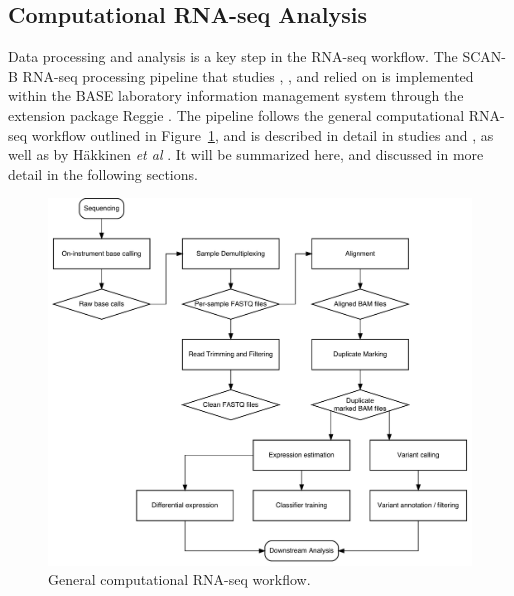 \documentclass[11pt]{book}
\newcommand{\scanb}{\mbox{SCAN-B}}
\begin{document}
\subsection{Computational RNA-seq Analysis}

Data processing and analysis is a key step in the RNA-seq workflow. The \scanb{} RNA-seq processing pipeline that studies \I, \III, and \IV relied on is implemented within the BASE laboratory information management system \cite{Base:2002, Base:2009} through the extension package Reggie \cite{Reggie:2016}. The pipeline follows the general computational RNA-seq workflow outlined in Figure~\ref{fig:rnaseq-workflow}, and is described in detail in studies \I and \III, as well as by Häkkinen \textit{et al} \cite{Reggie:2016}. It will be summarized here, and discussed in more detail in the following sections.

\begin{figure}[t]
\centering
\includegraphics[width=\textwidth]{img/rnaseq-computational-workflow.pdf}
\caption[General Computational RNA-seq Workflow]{General computational RNA-seq workflow.}
\label{fig:rnaseq-workflow}
\end{figure}
\end{document}

